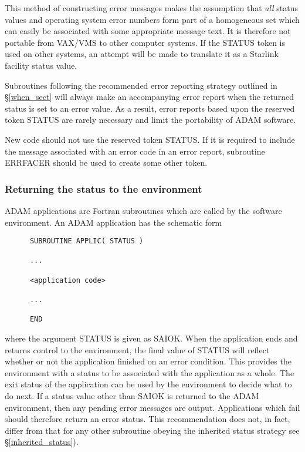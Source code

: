 \documentclass[twoside,11pt]{article}
\newcommand{\htmlref}[2]{#1}
\newcommand{\latex}[1]{#1}
\newcommand{\xlabel}[1]{}
\renewcommand{\_}{\texttt{\symbol{95}}}
\begin{document}
This method of constructing error messages makes the assumption that \emph{all}
status values and operating system error numbers form part of a homogeneous
set which can easily be associated with some appropriate message text.
It is therefore not portable from VAX/VMS to other computer systems.
If the STATUS token is used on other systems, an attempt will be made to
translate it as a Starlink facility status value.

Subroutines following the
\htmlref{recommended error reporting strategy}{when_sect}
\latex{ outlined in \S\ref{when_sect}} will
always make an accompanying error report when the returned status is set to an
error value.
As a result, error reports based upon the reserved token STATUS are rarely
necessary and limit the portability of ADAM software.

New code should not use the reserved token STATUS.
If it is required to include the message associated with an error code in an
error report, subroutine
\htmlref{ERR\_FACER}{ERR_FACER} should be used to create some other token.

\subsubsection{\xlabel{returning_the_status_to_the_environment}Returning the status to the environment}
ADAM applications are Fortran subroutines which are called by the software
environment.
An ADAM application has the schematic form
\begin {small}
\begin{verbatim}
      SUBROUTINE APPLIC( STATUS )

      ...

      <application code>

      ...

      END
\end{verbatim}
\end {small}

where the argument STATUS is given as SAI\_\_OK.
When the application ends and returns control to the environment, the final
value of STATUS will reflect whether or not the application finished on an
error condition.
This provides the environment with a status to be associated with the
application as a whole.
The exit status of the application can be used by the environment to decide
what to do next.
If a status value other than SAI\_\_OK is returned to the ADAM environment,
then any pending error messages are output.
Applications which fail should therefore return an error status.
This recommendation does not, in fact, differ from that for any other subroutine
obeying the
\htmlref
{inherited status strategy}{inherited_status}\latex{ see \S\ref{inherited_status})}.
\end{document}

